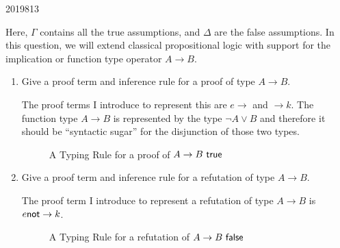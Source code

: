 \documentclass[10pt,\jkfside,a4paper]{article}
\begin{document}
\begin{enumerate}
\begin{examquestion}{2019}{8}{13}
\begin{enumerate}[label=(\alph*)]
        \end{enumerate}

        Here, $\Gamma$ contains all the true assumptions, and $\Delta$ are the false assumptions. In this question, we will extend classical propositional logic with support for the implication or function type operator $A \to B$.

        \begin{enumerate}[label=(\alph*)]

            \item Give a proof term and inference rule for a proof of type $A \to B$.

            The proof terms I introduce to represent this are $e \to$ and $\to k$. The function type $A \to B$ is represented by the type $\neg A \vee B$ and therefore it should be ``syntactic sugar'' for the disjunction of those two types.

            \begin{figure}[H]

                \centering

                \begin{prooftree}
                \end{prooftree}

                \caption{A Typing Rule for a proof of $A \to B\ \true$}

            \end{figure}

            \item Give a proof term and inference rule for a refutation of type $A \to B$.

            The proof term I introduce to represent a refutation of type $A \to B$ is $e \nnot\to k$.

            \begin{figure}[H]

                \centering

                \begin{prooftree}
                \end{prooftree}

                \caption{A Typing Rule for a refutation of $A \to B\ \false$}


\end{figure}
\end{enumerate}
\end{examquestion}
\end{enumerate}
\end{document}
